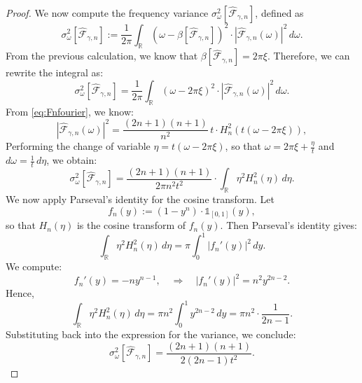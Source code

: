 \documentclass[preprint,hidelinks,authoryear]{elsarticle}
\theoremstyle{plain}
\theoremstyle{definition}
\theoremstyle{remark}
\begin{document}
\begin{proof}
We now compute the frequency variance $ \sigma_\omega^2[\hat{\mathcal{F}}_{\gamma,n}] $, defined as
$$
\sigma_\omega^2[\hat{\mathcal{F}}_{\gamma,n}] := \frac{1}{2\pi} \int_{\mathbb{R}} (\omega - \beta[\hat{\mathcal{F}}_{\gamma,n}])^2 \cdot |\hat{\mathcal{F}}_{\gamma,n}(\omega)|^2 \, d\omega.
$$
From the previous calculation, we know that $ \beta[\hat{\mathcal{F}}_{\gamma,n}] = 2\pi \xi $. Therefore, we can rewrite the integral as:
$$
\sigma_\omega^2[\hat{\mathcal{F}}_{\gamma,n}] = \frac{1}{2\pi} \int_{\mathbb{R}} (\omega - 2\pi \xi)^2 \cdot |\hat{\mathcal{F}}_{\gamma,n}(\omega)|^2 \, d\omega.
$$
From \eqref{eq:Fnfourier}, we know:
$$
|\hat{\mathcal{F}}_{\gamma,n}(\omega)|^2 = \frac{(2n+1)(n+1)}{n^2}\, t \cdot H_n^2(t(\omega-2\pi \xi)),
$$
Performing the change of variable $ \eta = t(\omega-2\pi \xi) $, so that $ \omega = 2\pi \xi + \frac{\eta}{t} $ and $ d\omega = \frac{1}{t} \, d\eta $, we obtain:
$$
\sigma_\omega^2[\hat{\mathcal{F}}_{\gamma,n}]= \frac{(2n+1)(n+1)}{2\pi n^2 t^2} \cdot \int_{\mathbb{R}} \eta^2 H_n^2(\eta) \, d\eta.
$$
We now apply Parseval’s identity for the cosine transform. Let
$$
f_n(y) := (1 - y^n) \cdot \mathds{1}_{[0,1]}(y),
$$
so that $ H_n(\eta) $ is the cosine transform of $ f_n(y) $. Then Parseval's identity gives:
$$
\int_{\mathbb{R}} \eta^2 H_n^2(\eta) \, d\eta = \pi \int_0^1 |f_n'(y)|^2 \, dy.
$$
We compute:
$$
f_n'(y) = -n y^{n-1}, \quad \Rightarrow \quad |f_n'(y)|^2 = n^2 y^{2n-2}.
$$
Hence,
$$
\int_{\mathbb{R}} \eta^2 H_n^2(\eta) \, d\eta = \pi n^2 \int_0^1 y^{2n-2} \, dy = \pi n^2 \cdot \frac{1}{2n - 1}.
$$
Substituting back into the expression for the variance, we conclude:
$$
\sigma_\omega^2[\hat{\mathcal{F}}_{\gamma,n}] = \frac{(2n+1)(n+1)}{2(2n-1)  t^2}.
$$


\end{proof}
\end{document}
